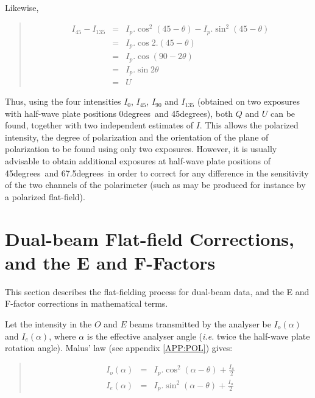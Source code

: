 \documentclass[twoside,11pt]{article}
\newcommand{\hyperref}[4]{#2\ref{#4}#3}
\newcommand{\xlabel}[1]{}
\renewcommand{\_}{\texttt{\symbol{95}}}
\newenvironment{myquote}{\begin{quote}\begin{small}}{\end{small}\end{quote}}
\newcommand{\dgs}{\hbox{$^\circ$}}
\renewcommand{\dgs}{degrees}
\begin{document}
Likewise,
\begin{myquote}
\begin{eqnarray*}
  I_{45} - I_{135} & = & I_{p}.\cos^{2}(45 - \theta) - I_{p}.\sin^{2}(45 - \theta) \\
                   & = & I_{p}.\cos 2.(45 - \theta) \\
                   & = & I_{p}.\cos (90 - 2\theta) \\
                   & = & I_{p}.\sin 2\theta \\
                   & = & U
\end{eqnarray*}
\end{myquote}

Thus, using the four intensities $I_{0}$, $I_{45}$, $I_{90}$ and $I_{135}$
(obtained on two exposures with half-wave plate positions 0\dgs\ and
45\dgs), both $Q$ and $U$ can be found, together with two
independent estimates of $I$. This allows the polarized intensity, the
degree of polarization and the orientation of the plane of polarization to
be found using only two exposures. However, it is usually advisable to
obtain additional exposures at half-wave plate positions of 45\dgs\ and
67.5\dgs\ in order to correct for any difference in the sensitivity of
the two channels of the polarimeter (such as may be produced for instance
by a polarized flat-field).

\newpage
\section{\label{APP:FFCOR}\xlabel{flatfieldcorrectionsandtheFFactor}Dual-beam
Flat-field Corrections, and the E and F-Factors}
This section describes the flat-fielding process for dual-beam data, and the 
E and F-factor corrections in mathematical terms.

Let the intensity in the $O$ and $E$ beams transmitted by the analyser be
$I_{o}(\alpha)$ and $I_{e}(\alpha)$, where $\alpha$ is the effective 
analyser angle (\emph{i.e.} twice the half-wave plate rotation angle).
\hyperref{Malus' law}{Malus' law (see appendix }{)}{APP:POL} gives:

\begin{myquote}
\begin{eqnarray*}
  I_{o}(\alpha) & = & I_{p}.\cos^{2}( \alpha - \theta ) + \frac{I_{u}}{2} \\
  I_{e}(\alpha) & = & I_{p}.\sin^{2}( \alpha - \theta ) + \frac{I_{u}}{2} 
\end{eqnarray*}
\end{myquote}
\end{document}
